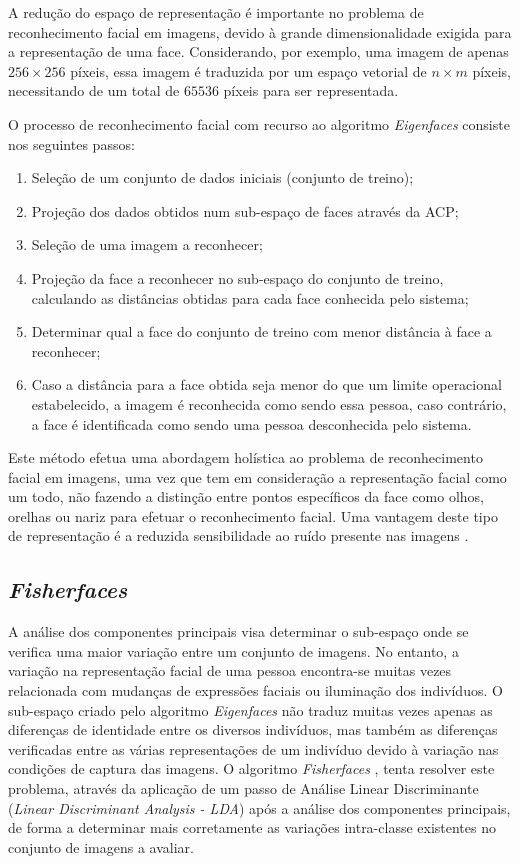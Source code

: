 A redução do espaço de representação é importante no problema de reconhecimento facial em imagens, devido à grande dimensionalidade exigida para a representação de uma face. Considerando, por exemplo, uma imagem de apenas $256 \times 256$ píxeis, essa imagem é traduzida por um espaço vetorial de $n \times m$ píxeis, necessitando de um total de $65536$ píxeis para ser representada.

O processo de reconhecimento facial com recurso ao algoritmo \textit{Eigenfaces} consiste nos seguintes passos:
\begin{enumerate}
\item Seleção de um conjunto de dados iniciais (conjunto de treino);
\item Projeção dos dados obtidos num sub-espaço de faces através da ACP;
\item Seleção de uma imagem a reconhecer;
\item Projeção da face a reconhecer no sub-espaço do conjunto de treino, calculando as distâncias obtidas para cada face conhecida pelo sistema;
\item Determinar qual a face do conjunto de treino com menor distância à face a reconhecer;
\item Caso a distância para a face obtida seja menor do que um limite operacional estabelecido, a imagem é reconhecida como sendo essa pessoa, caso contrário, a face é identificada como sendo uma pessoa desconhecida pelo sistema.
\end{enumerate}

Este método efetua uma abordagem holística ao problema de reconhecimento facial em imagens, uma vez que tem em consideração a representação facial como um todo, não fazendo a distinção entre pontos específicos da face como olhos, orelhas ou nariz para efetuar o reconhecimento facial. Uma vantagem deste tipo de representação é a reduzida sensibilidade ao ruído presente nas imagens \cite{Zhao2003}.

\subsection{\textit{Fisherfaces}} \label{sec:fisher}
A análise dos componentes principais visa determinar o sub-espaço onde se verifica uma maior variação entre um conjunto de imagens. No entanto, a variação na representação facial de uma pessoa encontra-se muitas vezes relacionada com mudanças de expressões faciais ou iluminação dos indivíduos. O sub-espaço criado pelo algoritmo \textit{Eigenfaces} não traduz muitas vezes apenas as diferenças de identidade entre os diversos indivíduos, mas também as diferenças verificadas entre as várias representações de um indivíduo devido à variação nas condições de captura das imagens. O algoritmo \textit{Fisherfaces} \cite{Belhumeur1997, Etemad1997, Zhao1998}, tenta resolver este problema, através da aplicação de um passo de Análise Linear Discriminante (\textit{Linear Discriminant Analysis - LDA}) após a análise dos componentes principais, de forma a determinar mais corretamente as variações intra-classe existentes no conjunto de imagens a avaliar.

